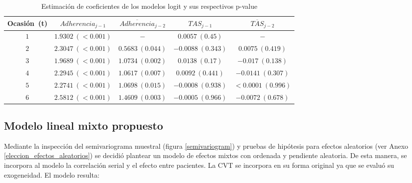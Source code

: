 \documentclass[spanish]{article}
\numberwithin{figure}{subsection}
\numberwithin{equation}{subsection}
\numberwithin{table}{subsection}
\begin{document}
\begin{table}[H]
	\centering
	\caption{Estimación de coeficientes de los modelos logit y sus respectivos p-value}
	\label{exog_table}
	\begin{tabular}{*{5}{|c}|}
		\hline
		Ocasión\ (t) & $Adherencia_{j-1}$ & $\overline{Adherencia}_{j-2}$ & $TAS_{j-1}$ &
		$\overline{TAS}_{j-2}$ \\
		\hline
		\hline
		$1$ & $1.9302\ (<0.001)$ & $-$ & $0.0057\ (0.45)$ & $-$ \\
		$2$ & $2.3047\ (<0.001)$ & $0.5683\ (0.044)$ & $-0.0088\ (0.343)$ &
		$0.0075\ (0.419)$ \\
		$3$ & $1.9689\ (<0.001)$ & $1.0734\ (0.002)$ & $0.0138\ (0.17)$ &
		$-0.017\ (0.138)$ \\
		$4$ & $2.2945\ (<0.001)$ & $1.0617\ (0.007)$ & $0.0092\ (0.441)$ &
		$-0.0141\ (0.307)$ \\
		$5$ & $2.2741\ (<0.001)$ & $1.0698\ (0.015)$ & $-0.0008\ (0.938)$ &
		$<0.0001\ (0.996)$ \\
		$6$ & $2.5812\ (<0.001)$ & $1.4609\ (0.003)$ & $-0.0005\ (0.966)$ &
		$-0.0072\ (0.678)$ \\
		\hline
	\end{tabular}
\end{table}

\subsection{Modelo lineal mixto propuesto}

Mediante la inspección del semivariograma muestral (figura \ref{semivariogram})
y pruebas de hipótesis para efectos aleatorios (ver Anexo
\ref{eleccion_efectos_aleatorios}) se decidió plantear un modelo de efectos
mixtos con ordenada y pendiente aleatoria. De esta manera, se incorpora al
modelo la correlación serial y el efecto entre pacientes. La CVT se incorpora en
su forma original ya que se evaluó su exogeneidad. El modelo resulta:



\end{document}
